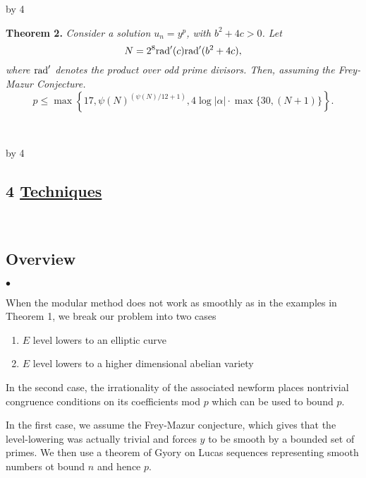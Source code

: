 \documentclass[12pt]{scrartcl}
\newenvironment{citemize}{
\begin{list}{$\bullet$}{\setlength{\itemsep}{0pt} \setlength{\rightmargin}{0pt} \setlength{\leftmargin}{0.5\labelwidth} \setlength{\topsep}{0pt}}
}{\end{list}}
\newcommand{\rad}{{\rm{rad}}}
\def\anzspalten{4}
\newlength{\kastenwidth}
\newenvironment{kasten}{%
  \begin{lrbox}{\dummybox}%
    \begin{minipage}{0.96\linewidth}}%
    {\end{minipage}%
  \end{lrbox}%
  \raisebox{-\depth}{\psshadowbox[framesep=1em]{\usebox{\dummybox}}}\\[0.5em]}
\newenvironment{spalte}{%
  \setlength\kastenwidth{1.2\textwidth}
  \divide\kastenwidth by \anzspalten
  \begin{minipage}[t]{\kastenwidth}}{\end{minipage}\hfill}
\begin{document}
\begin{lrbox}{\spalten}
{\begin{spalte}
\begin{kasten}
\textbf{\large\color{blue} Theorem 2.} \textit{Consider a solution $u_n = y^p$, with $b^2+4c >0$. Let \[ N = 2^8  {\rad}'(c)\rad'(b^2+4c),\]
where $\rad'$ denotes the product over odd prime divisors.  Then, assuming the Frey-Mazur Conjecture. 
\[ p \leq \max\left\{17,   \psi(N)^{(\psi(N)/12+1)}, 4\log{|\alpha|} \cdot  \max\{30,( N+1)\}  \right\}. \]}

\end{kasten}




\end{spalte}
    \begin{spalte}


\begin{kasten}
\section*{4 \hspace{0.1cm} {\color{red} 
\underline{Techniques}}}
\end{kasten}

\begin{kasten}

\subsection*{\color{blue} Overview}

\begin{citemize}
\item When the modular method does not work as smoothly as in the examples in Theorem 1, we break our problem into two cases
\begin{enumerate}

\item $E$ level lowers to an elliptic curve

\item $E$ level lowers to a higher dimensional abelian variety

\end{enumerate}

\item In the second case, the irrationality of the associated newform places nontrivial congruence conditions on its coefficients mod $p$ which can be used to bound $p$.

\item In the first case, we assume the Frey-Mazur conjecture, which gives that the level-lowering was actually trivial and forces $y$ to be smooth by a bounded set of primes.  We then use a theorem of Gyory on Lucas sequences representing smooth numbers ot bound $n$ and hence $p$.


\end{citemize}
\end{kasten}
\end{spalte}}
\end{lrbox}
\end{document}
